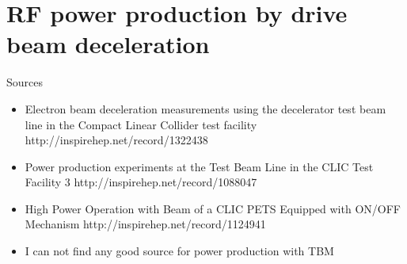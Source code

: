 \section{RF power production by drive beam deceleration}


Sources
\begin{itemize}
\item
Electron beam deceleration measurements using the decelerator test beam line in the Compact Linear Collider test facility
http://inspirehep.net/record/1322438
\item
Power production experiments at the Test Beam Line in the CLIC Test Facility 3
http://inspirehep.net/record/1088047
\item
High Power Operation with Beam of a CLIC PETS Equipped with ON/OFF Mechanism
http://inspirehep.net/record/1124941
\item
I can not find any good source for power production with TBM
\end{itemize}


